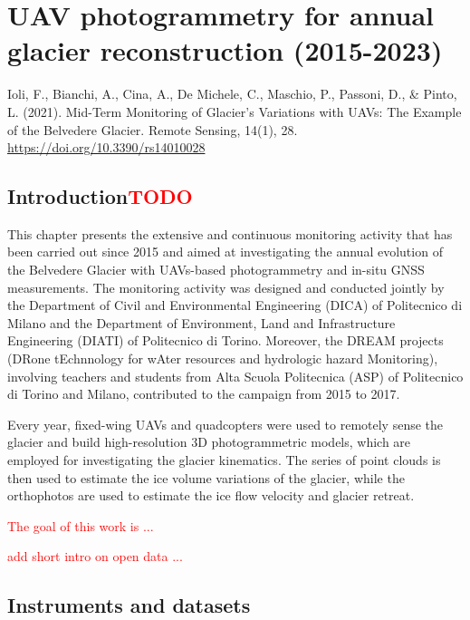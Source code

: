 \graphicspath{{figures/chapter3/}}
\onehalfspacing

\chapter{UAV photogrammetry for annual glacier reconstruction (2015-2023)}\label{ch:3}

\vfill


\noindent Ioli, F., Bianchi, A., Cina, A., De Michele, C., Maschio, P., Passoni, D., \&
Pinto, L. (2021). Mid-Term Monitoring of Glacier’s Variations with UAVs: The Example of
the Belvedere Glacier. Remote Sensing, 14(1), 28.
\url{https://doi.org/10.3390/rs14010028}

\newpage

\section{Introduction\textcolor{red}{TODO}}\label{sec:3:intro}

This chapter presents the extensive and continuous monitoring activity that has been carried out since 2015
and aimed at investigating the annual evolution of the Belvedere Glacier with UAVs-based photogrammetry and in-situ GNSS measurements.
The monitoring activity was designed and conducted jointly by the Department of Civil and Environmental Engineering (DICA) 
of Politecnico di Milano and the Department of Environment, Land and Infrastructure Engineering (DIATI) of Politecnico di Torino. 
Moreover, the DREAM projects (DRone tEchnnology for wAter resources and hydrologic hazard Monitoring), 
involving teachers and students from Alta Scuola Politecnica (ASP) of Politecnico di Torino and Milano, 
contributed to the campaign from 2015 to 2017.

Every year, fixed-wing UAVs and quadcopters were used to remotely sense the glacier and build 
high-resolution 3D photogrammetric models, which are employed for investigating the glacier kinematics.
The series of point clouds is then used to estimate the ice volume variations of the glacier, while the orthophotos
are used to estimate the ice flow velocity and glacier retreat. 


\textcolor{red}{The goal of this work is ...}

\textcolor{red}{add short intro on open data ...}


\section{Instruments and datasets}\label{sec:3:instrument}

